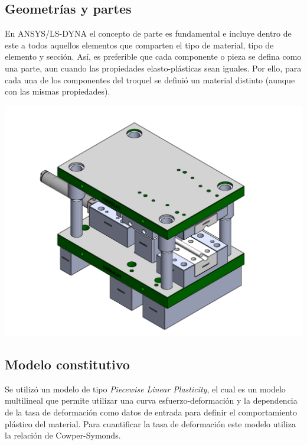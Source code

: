 \subsection{Geometrías y partes}

En ANSYS/LS-DYNA el concepto de parte es fundamental e incluye dentro de este a todos aquellos 
elementos que comparten el tipo de material, tipo de elemento y sección. Así, es preferible que 
cada componente o pieza se defina como una parte, aun cuando las propiedades elasto-plásticas 
sean iguales. Por ello, para cada una de los componentes del troquel se definió un material 
distinto (aunque con las mismas propiedades).

\begin{center}
\includegraphics[scale=0.55]{src/ch3/troquel}
\label{fig:all_tool}
\end{center}

\subsection{Modelo constitutivo}

Se utilizó un modelo de tipo \textit{Piecewise Linear Plasticity}, el cual es un modelo multilineal 
que permite utilizar una curva esfuerzo-deformación y la dependencia de la tasa de deformación 
como datos de entrada para definir el comportamiento plástico del material. Para cuantificar 
la tasa de deformación este modelo utiliza la relación de Cowper-Symonds.\\

